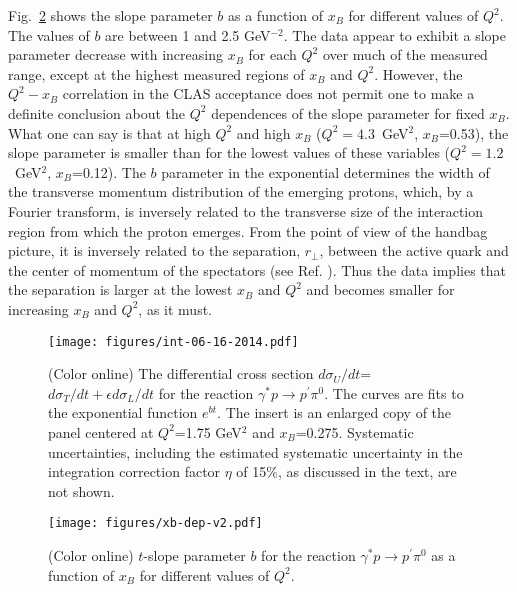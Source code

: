 \documentclass[prc,floatfix,twocolumn,superscriptaddress,letter]{revtex4}
\begin{document}
Fig.~\ref{fig:b_slope_xb_Q2} shows the slope parameter $b$ as a function of $x_B$ for different values of $Q^2$. 
The values of   $b$ are between 1 and 2.5 GeV$^{-2}$. The data appear to exhibit a slope parameter decrease with increasing $x_B$ for each $Q^2$ over much of the measured range, except at the highest measured regions of  $x_B$ and $Q^2$. However, the $Q^2-x_B$ correlation in the CLAS acceptance  does not permit one to make a definite conclusion about the  $Q^2$ dependences of the slope parameter for fixed $x_B$. What one can say is that at high $Q^2$ and high $x_B$  ($Q^2=4.3$~GeV$^2$, $x_B$=0.53), the slope parameter is smaller than for the lowest values of these variables ($Q^2=1.2$~GeV$^2$, $x_B$=0.12).  
The $b$ parameter in the exponential determines the  width of the transverse momentum distribution of the emerging protons, which, by  a Fourier  transform, is inversely related to the transverse size of the interaction region from which the proton emerges.  From the point of view of the handbag picture, it is inversely related to the  separation, $r_\perp$,   between the active quark and the center of momentum of the spectators (see Ref. \cite{Burkardt}). Thus the data implies that the separation is  larger at the lowest $x_B$ and $Q^2$ and becomes smaller for increasing $x_B$ and $Q^2$, as it must. 



\begin{figure*}
\begin{center}
\texttt{[image: figures/int-06-16-2014.pdf]}
\end{center}
\caption{(Color online)
The differential cross section $d\sigma_U/dt$=$d\sigma_T/dt+\epsilon d\sigma_L/dt$  for the reaction
$\gamma^*p\to p^\prime\pi^0$. The curves are fits to the exponential function $e^{bt}$. The insert is  an enlarged copy of the panel centered at $Q^2$=1.75 GeV$^2$ and 
$x_B$=0.275. Systematic uncertainties, including the estimated systematic uncertainty in the integration correction factor $\eta$ of 15\%, as discussed in the text, are not shown.} 

\label{fig:dsdt_log} 
\end{figure*}



\begin{figure}
\begin{center}
\texttt{[image: figures/xb-dep-v2.pdf]}
\end{center}
\caption{
(Color online)
$t$-slope parameter $b$ for the reaction $\gamma^* p \to p^\prime \pi^0$ as a function of $x_B$ for different values of $Q^2$. 
}
\label{fig:b_slope_xb_Q2} 
\end{figure}
\end{document}
